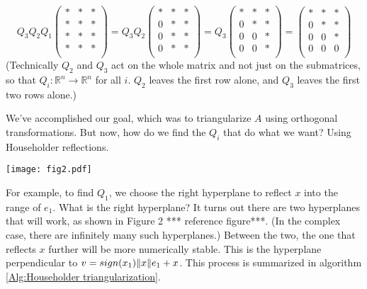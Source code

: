 \begin{equation*}
Q_3 Q_2 Q_1
\begin{pmatrix}
\ast & \ast & \ast \\
\ast & \ast & \ast \\
\ast & \ast & \ast \\
\ast & \ast & \ast \\
\end{pmatrix}
= Q_3 Q_2
\begin{pmatrix}
\ast & \ast & \ast \\
0 & \ast & \ast \\
0 & \ast & \ast \\
0 & \ast & \ast \\
\end{pmatrix}
= Q_3
\begin{pmatrix}
\ast & \ast & \ast \\
0 & \ast & \ast \\
0 & 0 & \ast \\
0 & 0 & \ast \\
\end{pmatrix}
= 
\begin{pmatrix}
\ast & \ast & \ast \\
0 & \ast & \ast \\
0 & 0 & \ast \\
0 & 0 & 0 \\
\end{pmatrix}
\end{equation*}
(Technically $Q_2$ and $Q_3$ act on the whole matrix and not just on the submatrices, so that $Q_i: \mathbb{R}^n \rightarrow \mathbb{R}^n$ for all $i$. $Q_2$ leaves the first row alone, and $Q_3$ leaves the first two rows alone.)

We've accomplished our goal, which was to triangularize $A$ using orthogonal transformations. But now, how do we find the $Q_i$ that do what we want? Using Householder reflections. 

\texttt{[image: fig2.pdf]}

For example, to find $Q_1$, we choose the right hyperplane to reflect $x$ into the range of $e_1$. What is the right hyperplane? It turns out there are two hyperplanes that will work, as shown in Figure 2 *** reference figure***. (In the complex case, there are infinitely many such hyperplanes.) Between the two, the one that reflects $x$ further will be more numerically stable. This is the hyperplane perpendicular to $v = sign(x_1)\lVert x\rVert e_1 + x$. This process is summarized in algorithm \ref{Alg:Householder triangularization}.


